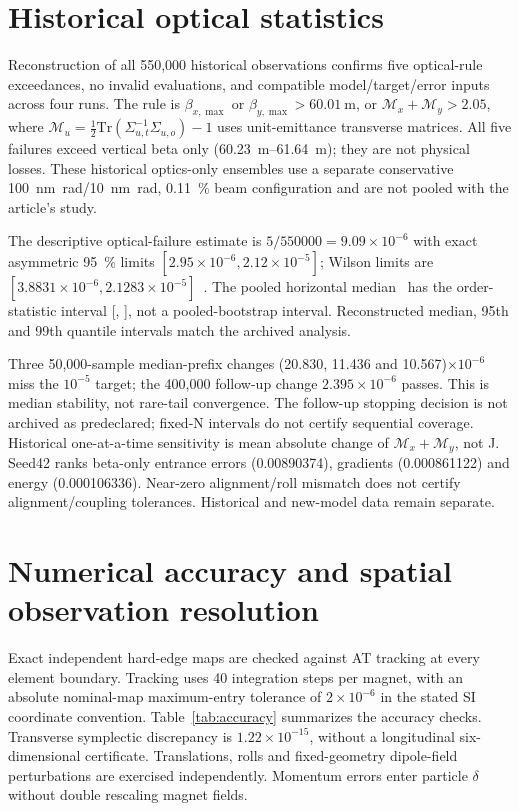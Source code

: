 \documentclass[10pt,a4paper]{article}
\begin{document}
\section{Historical optical statistics}
Reconstruction of all 550,000 historical observations confirms five optical-rule
exceedances, no invalid evaluations, and compatible model/target/error inputs
across four runs. The rule is $\beta_{x,\max}$ or $\beta_{y,\max}>\SI{60.01}{\metre}$,
or $\mathcal M_x+\mathcal M_y>2.05$, where
$\mathcal M_u=\tfrac12\mathrm{Tr}(\Sigma_{u,t}^{-1}\Sigma_{u,o})-1$
uses unit-emittance transverse matrices. All five failures exceed vertical beta
only (\SI{60.23}{\metre}--\SI{61.64}{\metre}); they are not physical losses. These historical optics-only ensembles use a separate conservative
\SI{100}{\nano\metre\radian}/\SI{10}{\nano\metre\radian}, \SI{0.11}{\percent} beam configuration and are not pooled with
the article's study.

The descriptive optical-failure estimate is $5/550000=9.09\times10^{-6}$ with
exact asymmetric \SI{95}{\percent} limits $[2.95\times10^{-6},2.12\times10^{-5}]$; Wilson
limits are $[3.8831\times10^{-6},2.1283\times10^{-5}]$~\cite{Wilson1927,Clopper1934}.
The pooled horizontal median \BtsMedianX\ has the order-statistic interval
[\BtsMedianXLo, \BtsMedianXHi], not a pooled-bootstrap interval. Reconstructed
median, 95th and 99th quantile intervals match the archived analysis.

Three 50,000-sample median-prefix changes (20.830, 11.436 and
10.567)$\times10^{-6}$ miss the $10^{-5}$ target; the 400,000 follow-up
change $2.395\times10^{-6}$ passes. This is median stability, not rare-tail
convergence. The follow-up stopping decision is not archived as predeclared;
fixed-N intervals do not certify sequential coverage. Historical one-at-a-time
sensitivity is mean absolute change of $\mathcal M_x+\mathcal M_y$, not J.
Seed42 ranks beta-only entrance errors (0.00890374), gradients (0.000861122)
and energy (0.000106336). Near-zero alignment/roll mismatch does not certify
alignment/coupling tolerances. Historical and new-model data remain separate.

\section{Numerical accuracy and spatial observation resolution}\label{sec:accuracy}
Exact independent hard-edge maps are checked against AT tracking at every element
boundary. Tracking uses 40 integration steps per magnet, with an absolute
nominal-map maximum-entry tolerance of $2\times10^{-6}$ in the stated SI
coordinate convention. Table~\ref{tab:accuracy} summarizes the accuracy checks.
Transverse symplectic discrepancy is $1.22\times10^{-15}$,
without a longitudinal six-dimensional certificate. Translations, rolls and
fixed-geometry dipole-field perturbations are exercised independently. Momentum
errors enter particle $\delta$ without double rescaling magnet fields.
\end{document}
